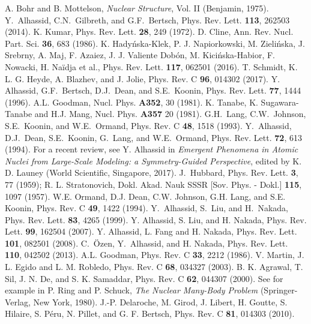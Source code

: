 \documentclass[prc,twocolumn,aps,showpacs,floatfix,nofootinbib,letterpaper,preprintnumbers]{revtex4-1}
\begin{document}
\begin{thebibliography}{99}
 A. Bohr and B. Mottelson, {\it Nuclear Structure}, 
 Vol. II (Benjamin, 1975).
 Y.~Alhassid, C.N.~Gilbreth, and G.F.~Bertsch,
  Phys. Rev. Lett. {\bf 113}, 262503 (2014).
 K. Kumar, Phys. Rev. Lett. {\bf 28}, 249 (1972).
 D. Cline, Ann. Rev. Nucl. Part. Sci. {\bf 36}, 683 (1986).  
 K. Hady\'nska-Klek,  P. J. Napiorkowski, M. Zieli\'nska, J. Srebrny, A. Maj, F. Azaiez, J. J. Valiente Dob\'on,
M. Kici\'nska-Habior, F. Nowacki, H. Na\"idja et al., Phys. Rev. Lett. {\bf 117}, 062501
(2016).
 T. Schmidt, K. L. G. Heyde, A. Blazhev, and J. Jolie,  Phys. Rev. C {\bf 96}, 014302 (2017).
 Y. Alhassid, G.F.~Bertsch, D.J.~Dean, and S.E.~Koonin, 
Phys. Rev. Lett. {\bf 77}, 1444 (1996). 
 A.L. Goodman, Nucl. Phys. {\bf A352}, 30 (1981).   
 K. Tanabe, K. Sugawara-Tanabe and H.J. Mang, Nucl. Phys. {\bf A357} 20 (1981).  
 G.H.~Lang, C.W.~Johnson, S.E.~Koonin, and W.E.~Ormand,
Phys. Rev. C {\bf 48}, 1518 (1993).
 Y.~Alhassid, D.J.~Dean, S.E.~Koonin, G.~Lang, and W.E.~Ormand,
Phys. Rev. Lett. {\bf 72}, 613 (1994).
 For a recent review, see Y. Alhassid in {\em Emergent Phenomena in Atomic Nuclei from Large-Scale Modeling: a Symmetry-Guided Perspective}, edited by K. D. Launey (World Scientific, Singapore, 2017). 
 J.~Hubbard, Phys. Rev. Lett. {\bf 3}, 77 (1959); R. L. Stratonovich, Dokl. Akad. Nauk SSSR [Sov. Phys. - Dokl.] {\bf 115}, 1097 (1957).
 W.E. Ormand, D.J. Dean, C.W. Johnson, G.H. Lang, and S.E. Koonin, Phys. Rev. C {\bf  49}, 1422 (1994). 
  Y.~Alhassid, S.~Liu, and H.~Nakada, Phys. Rev. Lett. {\bf 83}, 4265 (1999).
 Y. Alhassid, S. Liu, and H. Nakada, Phys. Rev. Lett. {\bf 99}, 162504 (2007).
  Y. Alhassid, L. Fang and H. Nakada, Phys. Rev. Lett. {\bf 101}, 082501 (2008).
 C.~\"{O}zen, Y.~Alhassid, and H. Nakada, Phys. Rev. Lett. {\bf 110}, 042502 (2013).
 A.L. Goodman, Phys. Rev. C {\bf 33}, 2212 (1986).
 V. Martin, J. L. Egido and L. M. Robledo, Phys. Rev. C {\bf 68}, 034327 (2003).
 B. K. Agrawal, T. Sil, J. N. De, and S. K. Samaddar,  Phys. Rev. C {\bf 62}, 044307 (2000).
 See for example in P. Ring and P. Schuck, {\em The Nuclear Many-Body Problem} (Springer-Verlag, New York, 1980). 
   J.-P. Delaroche,  M. Girod, J. Libert, H. Goutte, S. Hilaire, S. P\'eru, N. Pillet, and G. F. Bertsch, Phys. Rev. C {\bf 81}, 014303 (2010).
 
\end{thebibliography}
\end{document}

